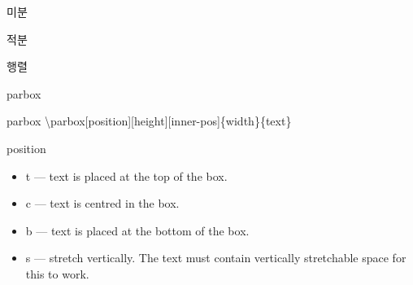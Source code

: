\documentclass[ aspectratio=149,  10pt,blue,xcolor=pdftex,dvipsnames,table,handout,notes]{beamer}
\begin{document}
		\begin{frame}[t]{미분}

		\note[item]{}
		\end{frame}


		\begin{frame}[t]{적분}

		\note[item]{}
		\end{frame}


		\begin{frame}[t]{행렬}

		\note[item]{}
		\end{frame}








		\begin{frame}[plain]
		\centering
		\scalebox{10}{BOX}

		\note[item]{}
		\end{frame}


		\begin{frame}[t]{parbox}

			\begin{block} {parbox}
			\textbackslash parbox[position][height][inner-pos]\{width\}\{text\}
			\end{block}

			\begin{block}{position}
			\begin{itemize}
			\item	t --- text is placed at the top of the box.
			\item	c --- text is centred in the box.
			\item	b --- text is placed at the bottom of the box.
			\item	s --- stretch vertically. The text must contain vertically stretchable space for this to work.
			\end{itemize}
			\end{block}


		\note[item]{}
		\end{frame}
\end{document}
